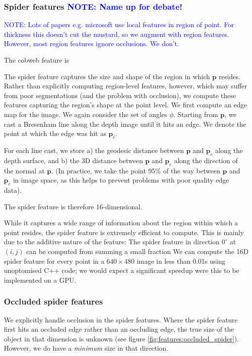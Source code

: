 \documentclass[10pt,twocolumn,letterpaper]{article}
\makeatletter
\renewcommand*{\eg}{e.g.\@\xspace}
\newcommand{\degree}{^{\circ}}
\newcommand{\point}{\mathbf{p}}
\newcommand{\note}[1]{\textcolor{blue}{NOTE: #1}}
\makeatother
\begin{document}
\subsubsection{Spider features \note{Name up for debate!}}

\note{Lots of papers \eg microsoft use local features in region of point. For thickness this doesn't cut the mustard, so we augment with region features. However, most region features ignore occlusions. We don't.}

The cobweb feature is 

The spider feature captures the size and shape of the region in which $\point$ resides. 
Rather than explicitly computing region-level features, however, which may suffer from poor segmentations (and the problem with occlusion), we compute these features capturing the region's shape at the point level. 
We first compute an edge map for the image.
We again consider the set of angles $\phi$. Starting from $\point$, we cast a Bresenham line along the depth image until it hits an edge. 
We denote the point at which the edge was hit as $\point_{e}$.

For each line cast, we store
a) the geodesic distance between $\point$ and $\point_{e}$ along the depth surface, and 
b) the 3D distance between $\point$ and $\point_{e}$ along the direction of the normal at $\point$. (In practice, we take the point 95\% of the way between $\point$ and $\point_{e}$ in image space, as this helps to prevent problems with poor quality edge data).

The spider feature is therefore 16-dimensional.

While it captures a wide range of information about the region within which a point resides, the spider feature is extremely efficient to compute.
This is mainly due to the additive nature of the feature: The spider feature in direction $0\degree$ at $(i, j)$ can be computed from summing a small fraction 
We can compute the 16D spider feature for every point in a $640\times480$ image in less than 0.01s using unoptomised C++ code; we would expect a significant speedup were this to be implemented on a GPU.

\subsubsection{Occluded spider features}

We explicitly handle occlusion in the spider features. Where the spider feature first hits an occluded edge rather than an occluding edge, the true size of the object in that dimension is unknown (see figure \ref{fig:features:occluded_spider}).
However, we do have a \textit{minimum} size in that direction.
\end{document}
